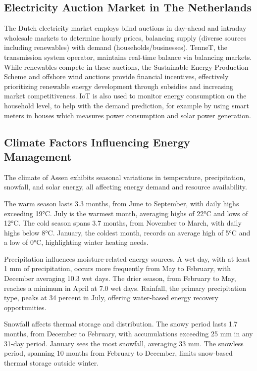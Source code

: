 \documentclass{article}
\begin{document}
\subsection{Electricity Auction Market in The Netherlands}
The Dutch electricity market employs blind auctions in day-ahead and intraday wholesale markets to determine hourly prices, balancing supply (diverse sources including renewables) with demand (households/businesses). TenneT, the transmission system operator, maintains real-time balance via balancing markets\cite{tennetmarketfacilitation}. While renewables compete in these auctions, the Sustainable Energy
Production Scheme and offshore wind auctions provide financial incentives\cite{dutchoffshorewind}, effectively prioritizing renewable energy development through subsidies and increasing market competitiveness. IoT is also used to monitor energy consumption on the household level, to help with the demand prediction\cite{cbs2022slimmeapparaten}, for example by using smart meters in houses which measures power consumption and solar power generation. 

\subsection{Climate Factors Influencing Energy Management}
The climate of Assen exhibits seasonal variations in temperature, precipitation, snowfall, and solar energy, all affecting energy demand and resource availability.

The warm season lasts 3.3 months, from June to September, with daily highs exceeding 19°C. July is the warmest month, averaging highs of 22°C and lows of 12°C. The cold season spans 3.7 months, from November to March, with daily highs below 8°C. January, the coldest month, records an average high of 5°C and a low of 0°C, highlighting winter heating needs. \cite{weatherspark_assen}

Precipitation influences moisture-related energy sources. A wet day, with at least 1 mm of precipitation, occurs more frequently from May to February, with December averaging 10.3 wet days. The drier season, from February to May, reaches a minimum in April at 7.0 wet days. Rainfall, the primary precipitation type, peaks at 34 percent in July, offering water-based energy recovery opportunities. \cite{weatherspark_assen}

Snowfall affects thermal storage and distribution. The snowy period lasts 1.7 months, from December to February, with accumulations exceeding 25 mm in any 31-day period. January sees the most snowfall, averaging 33 mm. The snowless period, spanning 10 months from February to December, limits snow-based thermal storage outside winter. \cite{weatherspark_assen}
\end{document}
